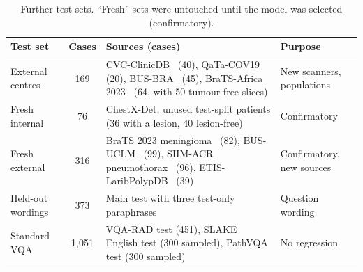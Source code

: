\documentclass[11pt]{article}
\begin{document}
\begin{table}[t]
\centering\footnotesize\setlength{\tabcolsep}{3.5pt}
\caption{Further test sets. ``Fresh'' sets were untouched until the model was selected (confirmatory).}
\label{tab:tests}
\begin{tabular}{l c p{7.7cm} p{2.6cm}}
\toprule
Test set & Cases & Sources (cases) & Purpose \\
\midrule
External centres & 169 & CVC-ClinicDB~\cite{cvc} (40), QaTa-COV19~\cite{qata} (20), BUS-BRA~\cite{busbra} (45), BraTS-Africa 2023~\cite{bratsafrica,bratsafricaj} (64, with 50 tumour-free slices) & New scanners, populations \\
Fresh internal & 76 & ChestX-Det, unused test-split patients (36 with a lesion, 40 lesion-free) & Confirmatory \\
Fresh external & 316 & BraTS 2023 meningioma~\cite{bratsmen} (82), BUS-UCLM~\cite{busuclm} (99), SIIM-ACR pneumothorax~\cite{siim} (96), ETIS-LaribPolypDB~\cite{etis} (39) & Confirmatory, new sources \\
Held-out wordings & 373 & Main test with three test-only paraphrases & Question wording \\
Standard VQA & 1,051 & VQA-RAD test (451), SLAKE English test (300 sampled), PathVQA test (300 sampled) & No regression \\
\bottomrule
\end{tabular}
\end{table}
\end{document}
